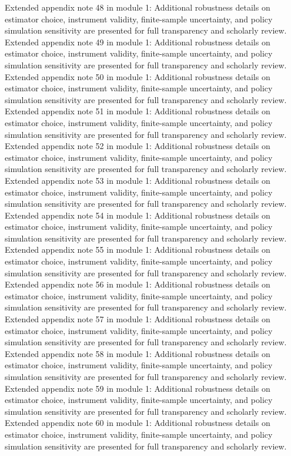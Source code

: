 \documentclass[preprint,12pt]{elsarticle}
\begin{document}
Extended appendix note 48 in module 1: Additional robustness details on estimator choice, instrument validity, finite-sample uncertainty, and policy simulation sensitivity are presented for full transparency and scholarly review.
Extended appendix note 49 in module 1: Additional robustness details on estimator choice, instrument validity, finite-sample uncertainty, and policy simulation sensitivity are presented for full transparency and scholarly review.
Extended appendix note 50 in module 1: Additional robustness details on estimator choice, instrument validity, finite-sample uncertainty, and policy simulation sensitivity are presented for full transparency and scholarly review.
Extended appendix note 51 in module 1: Additional robustness details on estimator choice, instrument validity, finite-sample uncertainty, and policy simulation sensitivity are presented for full transparency and scholarly review.
Extended appendix note 52 in module 1: Additional robustness details on estimator choice, instrument validity, finite-sample uncertainty, and policy simulation sensitivity are presented for full transparency and scholarly review.
Extended appendix note 53 in module 1: Additional robustness details on estimator choice, instrument validity, finite-sample uncertainty, and policy simulation sensitivity are presented for full transparency and scholarly review.
Extended appendix note 54 in module 1: Additional robustness details on estimator choice, instrument validity, finite-sample uncertainty, and policy simulation sensitivity are presented for full transparency and scholarly review.
Extended appendix note 55 in module 1: Additional robustness details on estimator choice, instrument validity, finite-sample uncertainty, and policy simulation sensitivity are presented for full transparency and scholarly review.
Extended appendix note 56 in module 1: Additional robustness details on estimator choice, instrument validity, finite-sample uncertainty, and policy simulation sensitivity are presented for full transparency and scholarly review.
Extended appendix note 57 in module 1: Additional robustness details on estimator choice, instrument validity, finite-sample uncertainty, and policy simulation sensitivity are presented for full transparency and scholarly review.
Extended appendix note 58 in module 1: Additional robustness details on estimator choice, instrument validity, finite-sample uncertainty, and policy simulation sensitivity are presented for full transparency and scholarly review.
Extended appendix note 59 in module 1: Additional robustness details on estimator choice, instrument validity, finite-sample uncertainty, and policy simulation sensitivity are presented for full transparency and scholarly review.
Extended appendix note 60 in module 1: Additional robustness details on estimator choice, instrument validity, finite-sample uncertainty, and policy simulation sensitivity are presented for full transparency and scholarly review.
\end{document}
